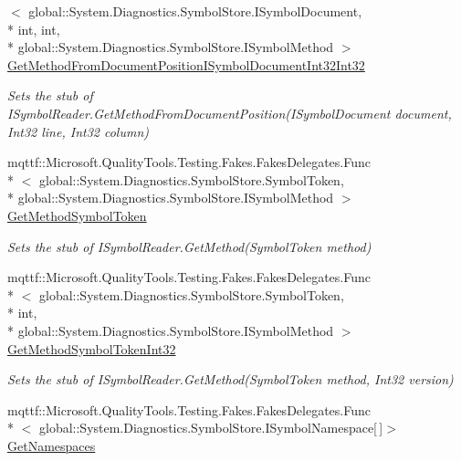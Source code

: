 \begin{DoxyCompactItemize}
$<$ global\-::\-System.\-Diagnostics.\-Symbol\-Store.\-I\-Symbol\-Document, \\*
int, int, \\*
global\-::\-System.\-Diagnostics.\-Symbol\-Store.\-I\-Symbol\-Method $>$ \hyperlink{class_system_1_1_diagnostics_1_1_symbol_store_1_1_fakes_1_1_stub_i_symbol_reader_aff833d7da62730091484ae360f1f0822}{Get\-Method\-From\-Document\-Position\-I\-Symbol\-Document\-Int32\-Int32}
\begin{DoxyCompactList}\small\item\em Sets the stub of I\-Symbol\-Reader.\-Get\-Method\-From\-Document\-Position(\-I\-Symbol\-Document document, Int32 line, Int32 column)\end{DoxyCompactList}\item 
mqttf\-::\-Microsoft.\-Quality\-Tools.\-Testing.\-Fakes.\-Fakes\-Delegates.\-Func\\*
$<$ global\-::\-System.\-Diagnostics.\-Symbol\-Store.\-Symbol\-Token, \\*
global\-::\-System.\-Diagnostics.\-Symbol\-Store.\-I\-Symbol\-Method $>$ \hyperlink{class_system_1_1_diagnostics_1_1_symbol_store_1_1_fakes_1_1_stub_i_symbol_reader_ac7852d5923b1f32470895b7ab650fe39}{Get\-Method\-Symbol\-Token}
\begin{DoxyCompactList}\small\item\em Sets the stub of I\-Symbol\-Reader.\-Get\-Method(\-Symbol\-Token method)\end{DoxyCompactList}\item 
mqttf\-::\-Microsoft.\-Quality\-Tools.\-Testing.\-Fakes.\-Fakes\-Delegates.\-Func\\*
$<$ global\-::\-System.\-Diagnostics.\-Symbol\-Store.\-Symbol\-Token, \\*
int, \\*
global\-::\-System.\-Diagnostics.\-Symbol\-Store.\-I\-Symbol\-Method $>$ \hyperlink{class_system_1_1_diagnostics_1_1_symbol_store_1_1_fakes_1_1_stub_i_symbol_reader_a105f48c02dc9f5f6fd4cbd176cffe5e6}{Get\-Method\-Symbol\-Token\-Int32}
\begin{DoxyCompactList}\small\item\em Sets the stub of I\-Symbol\-Reader.\-Get\-Method(\-Symbol\-Token method, Int32 version)\end{DoxyCompactList}\item 
mqttf\-::\-Microsoft.\-Quality\-Tools.\-Testing.\-Fakes.\-Fakes\-Delegates.\-Func\\*
$<$ global\-::\-System.\-Diagnostics.\-Symbol\-Store.\-I\-Symbol\-Namespace\mbox{[}$\,$\mbox{]}$>$ \hyperlink{class_system_1_1_diagnostics_1_1_symbol_store_1_1_fakes_1_1_stub_i_symbol_reader_acf2c42b43ed94390a6482c9b443cf488}{Get\-Namespaces}

\end{DoxyCompactItemize}
